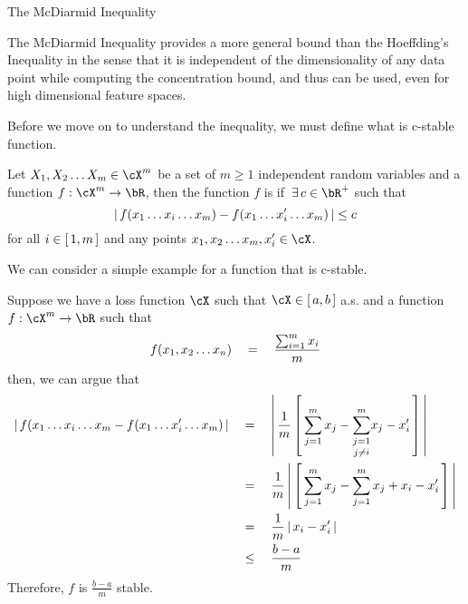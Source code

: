 \documentclass[11pt,a4paper]{article}
\begin{document}
\begin{ssection}{The McDiarmid Inequality}
	
	The McDiarmid Inequality provides a more general bound than the Hoeffding's Inequality in the sense that it is independent of the dimensionality of any data point while computing the concentration bound, and thus can be used, even for high dimensional feature spaces.
	
	Before we move on to understand the inequality, we must define what is c-stable function. \br
	
	\begin{definition}
		Let $X_1, X_2 \dots X_m \in \cX^m$ be a set of $m \ge 1$ independent random variables and a function $f : \cX^m \ra \bR$, then the function $f$ is  if $\qexists c \in \bR^+$ such that
		\begin{equation}
			\left| \,{f(x_1 \dots x_i \dots x_m) - f(x_1 \dots x_i' \dots x_m)}\, \right|	\le	c
		\end{equation}
		for all $i \in \left[\,{1, m}\,\right]$ and any points $x_1, x_2 \dots x_m, x_i' \in \cX$.
		\label{eq:c-stable}
	\end{definition} \br
	
	We can consider a simple example for a function that is c-stable. \br
	
	\begin{example}
		Suppose we have a loss function $\cX$ such that $\cX \in \brac{a, b}$ a.s. and a function $f : \cX^m \ra \bR$ such that
		\begin{align*}
			f(x_1, x_2 \dots x_n)	\quad = \quad	\frac{\sum_{i = 1}^m x_i}{m} 
		\end{align*}
		then, we can argue that
		\begin{align*}
			\left| \,{f(x_1 \dots x_i \dots x_m - f(x_1 \dots x_i' \dots x_m)}\, \right| & \quad = \quad	\left| \,{\frac{1}{m} \left[\,{\sum_{j = 1}^m x_j - \underset{j \ne i}{\sum_{j = 1}^{m}} x_j - x_i'}\,\right]}\, \right| \\
			                                                              & \quad = \quad	\frac{1}{m} \left| \,{\left[\,{\sum_{j = 1}^m x_j - \sum_{j = 1}^m x_j + x_i - x_i'}\,\right]}\, \right|                 \\
			                                                              & \quad = \quad	\frac{1}{m} \left| \,{x_i - x_i'}\, \right|                                                                  \\
			                                                              & \quad \le \quad	\frac{b - a}{m}                                                                              
		\end{align*}
		Therefore, $f$ is $\frac{b - a}{m}$ stable.
		\label{ex:hoeffding}
	\end{example}
	

\end{ssection}
\end{document}

